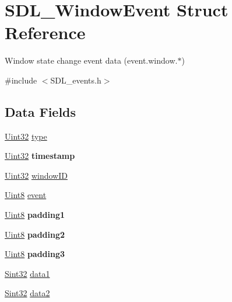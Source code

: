 \hypertarget{struct_s_d_l___window_event}{}\section{S\+D\+L\+\_\+\+Window\+Event Struct Reference}
\label{struct_s_d_l___window_event}


Window state change event data (event.\+window.$\ast$)  




{\ttfamily \#include $<$S\+D\+L\+\_\+events.\+h$>$}

\subsection*{Data Fields}
\begin{DoxyCompactItemize}
\item 
\hyperlink{_s_d_l__stdinc_8h_add440eff171ea5f55cb00c4a9ab8672d}{Uint32} \hyperlink{struct_s_d_l___window_event_aa40a9b05c3154032b9f2d7220e9f08dc}{type}
\item 
\hyperlink{_s_d_l__stdinc_8h_add440eff171ea5f55cb00c4a9ab8672d}{Uint32} {\bfseries timestamp}\hypertarget{struct_s_d_l___window_event_abf1ed7edeab81db9c05d899836a44a2f}{}\label{struct_s_d_l___window_event_abf1ed7edeab81db9c05d899836a44a2f}

\item 
\hyperlink{_s_d_l__stdinc_8h_add440eff171ea5f55cb00c4a9ab8672d}{Uint32} \hyperlink{struct_s_d_l___window_event_a78d9995068d6f40cd78bb8db7351b0a1}{window\+ID}
\item 
\hyperlink{_s_d_l__stdinc_8h_a2944638813a090aa23e62f4da842c3e2}{Uint8} \hyperlink{struct_s_d_l___window_event_a3e1cf32cd85f71fa3040d99d2eae0cb5}{event}
\item 
\hyperlink{_s_d_l__stdinc_8h_a2944638813a090aa23e62f4da842c3e2}{Uint8} {\bfseries padding1}\hypertarget{struct_s_d_l___window_event_a418ddf227b900bac743797ea1d27040f}{}\label{struct_s_d_l___window_event_a418ddf227b900bac743797ea1d27040f}

\item 
\hyperlink{_s_d_l__stdinc_8h_a2944638813a090aa23e62f4da842c3e2}{Uint8} {\bfseries padding2}\hypertarget{struct_s_d_l___window_event_a09e3169fff93f108fc1dab93014eb1fb}{}\label{struct_s_d_l___window_event_a09e3169fff93f108fc1dab93014eb1fb}

\item 
\hyperlink{_s_d_l__stdinc_8h_a2944638813a090aa23e62f4da842c3e2}{Uint8} {\bfseries padding3}\hypertarget{struct_s_d_l___window_event_a2876881016c4222a885f1fabef292d1d}{}\label{struct_s_d_l___window_event_a2876881016c4222a885f1fabef292d1d}

\item 
\hyperlink{_s_d_l__stdinc_8h_a7a90b941db9d4582e9ad7abb9940ff7e}{Sint32} \hyperlink{struct_s_d_l___window_event_a5bece3f0001ebcf1df7ff849ba3cd075}{data1}
\item 
\hyperlink{_s_d_l__stdinc_8h_a7a90b941db9d4582e9ad7abb9940ff7e}{Sint32} \hyperlink{struct_s_d_l___window_event_ad6f74222e0343d2037d61e09355595c2}{data2}
\end{DoxyCompactItemize}


